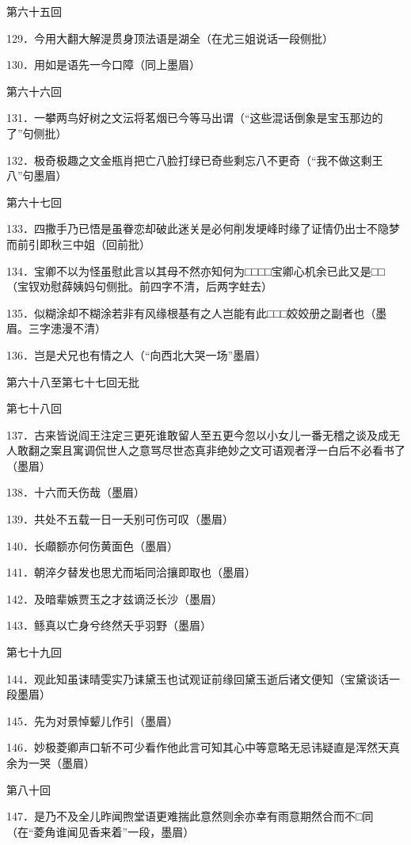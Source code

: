 第六十五回

129．今用大翻大解湜贯身顶法语是湖全{（\kaishu 在尤三姐说话一段侧批）}

130．用如是语先一今口障{（\kaishu 同上墨眉）}

第六十六回

131．一攀两鸟好树之文沄将茗烟已今等马出谓{（\kaishu ``这些混话倒象是宝玉那边的了''句侧批）}

132．极奇极趣之文金瓶肖把亡八脸打绿已奇些剩忘八不更奇{（\kaishu ``我不做这剩王八''句墨眉）}

第六十七回

133．四撒手乃已悟是虽眷恋却破此迷关是必何削发埂峰时缘了证情仍出士不隐梦而前引即秋三中姐{（\kaishu 回前批）}

134．宝卿不以为怪虽慰此言以其母不然亦知何为□□□□宝卿心机余已此又是□□{（\kaishu 宝钗劝慰薛姨妈句侧批。前四字不清，后两字蛀去）}

135．似糊涂却不糊涂若非有风缘根基有之人岂能有此□□□姣姣册之副者也{（\kaishu 墨眉。三字漶漫不清）}

136．岂是犬兄也有情之人{（\kaishu ``向西北大哭一场''墨眉）}

第六十八至第七十七回无批

第七十八回

137．古来皆说阎王注定三更死谁敢留人至五更今忽以小女儿一番无稽之谈及成无人敢翻之案且寓调侃世人之意骂尽世态真非绝妙之文可语观者浮一白后不必看书了{（\kaishu 墨眉）}

138．十六而夭伤哉{（\kaishu 墨眉）}

139．共处不五载一日一夭别可伤可叹{（\kaishu 墨眉）}

140．长顑额亦何伤黄面色{（\kaishu 墨眉）}

141．朝淬夕替发也思尤而垢同洽攘即取也{（\kaishu 墨眉）}

142．及暗辈嫉贾玉之才兹谪泛长沙{（\kaishu 墨眉）}

143．鲧真以亡身兮终然夭乎羽野{（\kaishu 墨眉）}

第七十九回

144．观此知虽诔晴雯实乃诔黛玉也试观证前缘回黛玉逝后诸文便知{（\kaishu 宝黛谈话一段墨眉）}

145．先为对景悼颦儿作引{（\kaishu 墨眉）}

146．妙极菱卿声口斩不可少看作他此言可知其心中等意略无忌讳疑直是浑然天真余为一哭{（\kaishu 墨眉）}

第八十回

147．是乃不及全儿昨闻煦堂语更难揣此意然则余亦幸有雨意期然合而不□同{（\kaishu 在``菱角谁闻见香来着''一段，墨眉）}

